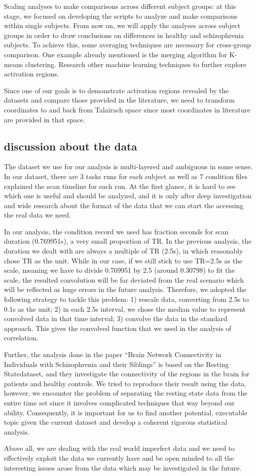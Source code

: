 \documentclass[11pt]{article}
\begin{document}
Scaling analyses to make comparisons across different subject groups: at this
stage, we focused on developing the scripts to analyze and make comparisons
within single subjects. From now on, we will apply the analyses across subject
groups in order to draw conclusions on differences in healthy and schizophrenia
subjects. To achieve this, some averaging techniques are necessary for
cross-group comparison. One example already mentioned is the merging algorithm
for K-means clustering. Research other machine learning techniques to further
explore activation regions.

Since one of our goals is to demonstrate activation regions revealed by the
datasets and compare those provided in the literature, we need to transform
coordinates to and back from Talairach space since most coordinates in
literature are provided in that space.

\subsection{discussion about the data}

The dataset we use for our analysis is multi-layered and ambiguous in some
sense. In our dataset, there are 3 tasks runs for each subject as well as 7
condition files explained the scan timeline for each run. At the first glance,
it is hard to see which one is useful and should be analyzed, and it is only
after deep investigation and wide research about the format of the data that we
can start the accessing the real data we need. 

In our analysis, the condition record we used has fraction seconds for scan
duration (0.769951s), a very small proportion of TR. In the previous analysis,
the duration we dealt with are always a multiple of TR (2.5s), in which
reasonably chose TR as the unit. While in our case, if we still stick to use
TR=2.5s as the scale, meaning we have to divide 0.769951 by 2.5 (around 
0.30798)
to fit the scale, the resulted convolution will be far deviated from the real
scenario which will be reflected as huge errors in the future 
analysis. Therefore, we adopted the following strategy to tackle this problem:
1) rescale data, converting from 2.5s to 0.1s as the unit; 2) in each 2.5s
interval, we chose the median value to represent convolved data in that time
interval; 3) convolve the data in the standard approach. This gives the
convolved function that we used in the analysis of correlation. 

Further, the analysis done in the paper  “Brain Network Connectivity in
Individuals with Schizophrenia and their Siblings” is based on the Resting 
Statedataset, and they investigate the connectivity of the regions in the brain 
for
patients and healthy controls. We tried to reproduce their result using the
data, however, we encounter the problem of separating the resting state data
from the entire time set since it involves complicated techniques that way
beyond our ability. Consequently, it is important for us to find another
potential, executable topic given the current dataset and develop a coherent
rigorous statistical analysis.

Above all, we are dealing with the real world imperfect data and we need to
effectively exploit the data we currently have and be open minded to all the
interesting issues arose from the data which may be investigated in the future.


\end{document}
